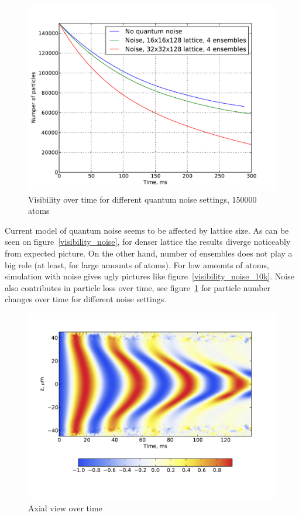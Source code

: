 \documentclass[12pt,notitlepage]{report}
\begin{document}
\begin{figure}
\includegraphics[width=4.5in]{particles_150k.pdf}
\caption{Visibility over time for different quantum noise settings, 150000 atoms}
\label{particle_number}
\end{figure}

Current model of quantum noise seems to be affected by lattice size.
As can be seen on figure~\ref{visibility_noise}, for denser lattice the results diverge noticeably from expected picture.
On the other hand, number of ensembles does not play a big role (at least, for large amounts of atoms).
For low amounts of atoms, simulation with noise gives ugly pictures like figure~\ref{visibility_noise_10k}.
Noise also contributes in particle loss over time,
see figure~\ref{particle_number} for particle number changes over time for different noise settings.

\begin{figure}
\includegraphics[width=4.5in]{axial_view.pdf}
\caption{Axial view over time}
\label{axial_view}
\end{figure}
\end{document}
